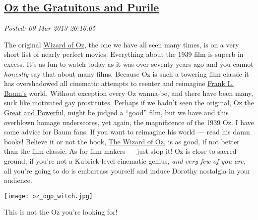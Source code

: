 %

\subsection*{\href{http://bakerjd99.wordpress.com/2013/03/09/oz-the-gratuitous-and-purile/}{Oz the Gratuitous and Purile}}


\noindent\emph{Posted: 09 Mar 2013 20:16:05}
\vspace{6pt}


\captionsetup[floatingfigure]{labelformat=empty}

The original
\href{http://www.rottentomatoes.com/m/1092277-wizard\_of\_oz/}{Wizard of
Oz}, the one we have all seen many times, is on a very short list of
nearly perfect movies. Everything about the 1939 film is superb in
excess. It's as fun to watch today as it was over seventy years ago and
you cannot \emph{honestly} say that about many films. Because Oz
is such a towering film classic it has overshadowed all cinematic attempts to
reenter and reimagine \href{http://www.online-literature.com/baum/}{Frank L. Baum's} world.
Without exception every Oz wanna-be, and there have been many, suck like
motivated gay prostitutes. Perhaps if we hadn't seen the original,
\href{http://disney.go.com/thewizard/}{Oz the Great and Powerful}, might
be judged a ``good'' film, but we have and this overblown
homage underscores, yet again, the magnificence of the 1939 Oz. I have
some advice for Baum fans. If you want to reimagine his world --- read
his damn books! Believe it or not the book,
\href{http://www.booksshouldbefree.com/book/the-wonderful-wizard-of-oz}{The
Wizard of Oz}, is as good, if not better than the film classic. As for
film makers --- just stop it! Oz is close to sacred ground; if you're
not a Kubrick-level cinematic genius, \emph{and very few of you are,}
all you're going to do is embarrass yourself and induce Dorothy
nostalgia in your audience.
\begin{floatingfigure}[r]{0.39\textwidth}
\centering
\href{http://screencrush.com/oz-the-great-and-powerful-poster-wicked-witch-2/}{\texttt{[image: oz\_ogp\_witch.jpg]}}
\caption{This is not the Oz you're looking for!}
\label{fig:3815X0}
\end{floatingfigure}

